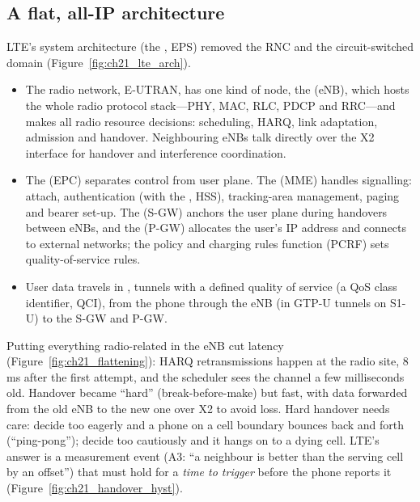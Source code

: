 
\subsection{A flat, all-IP architecture}

LTE's system architecture (the , EPS) removed the RNC and the
circuit-switched domain (Figure~\ref{fig:ch21_lte_arch}).
\begin{itemize}
\item The radio network, E-UTRAN, has one kind of node, the  (eNB), which hosts the
whole radio protocol stack---PHY, MAC, RLC, PDCP and RRC---and makes all radio resource decisions:
scheduling, HARQ, link adaptation, admission and handover. Neighbouring eNBs talk directly over the
X2 interface for handover and interference coordination.

\item The  (EPC) separates control from user plane. The
 (MME) handles signalling: attach, authentication (with the
, HSS), tracking-area management, paging and bearer set-up. The
 (S-GW) anchors the user plane during handovers between eNBs, and the
 (P-GW) allocates the user's IP address and connects to external networks; the
policy and charging rules function (PCRF) sets quality-of-service rules.
\item User data travels in , tunnels with a defined quality of service (a QoS class
identifier, QCI), from the phone through the eNB (in GTP-U tunnels on S1-U) to the S-GW and P-GW.
\end{itemize}

Putting everything radio-related in the eNB cut latency (Figure~\ref{fig:ch21_flattening}): HARQ
retransmissions happen at the radio site, 8\,ms after the first attempt, and the scheduler sees the
channel a few milliseconds old. Handover became ``hard'' (break-before-make) but fast, with data
forwarded from the old eNB to the new one over X2 to avoid loss. Hard handover needs care: decide
too eagerly and a phone on a cell boundary bounces back and forth (``ping-pong''); decide too
cautiously and it hangs on to a dying cell. LTE's answer is a measurement event (A3: ``a neighbour
is better than the serving cell by an offset'') that must hold for a \emph{time to trigger} before
the phone reports it (Figure~\ref{fig:ch21_handover_hyst}).

